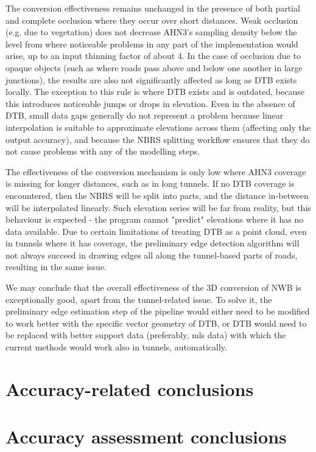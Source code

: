 The conversion effectiveness remains unchanged in the presence of both partial and complete occlusion where they occur over short distances. Weak occlusion (e.g. due to vegetation) does not decrease AHN3's sampling density below the level from where noticeable problems in any part of the implementation would arise, up to an input thinning factor of about 4. In the case of occlusion due to opaque objects (such as where roads pass above and below one another in large junctions), the results are also not significantly affected as long as DTB exists locally. The exception to this rule is where DTB exists and is outdated, because this introduces noticeable jumps or drops in elevation. Even in the absence of DTB, small data gaps generally do not represent a problem because linear interpolation is suitable to approximate elevations across them (affecting only the output accuracy), and because the NBRS splitting workflow ensures that they do not cause problems with any of the modelling steps.

The effectiveness of the conversion mechanism is only low where AHN3 coverage is missing for longer distances, such as in long tunnels. If no DTB coverage is encountered, then the NBRS will be split into parts, and the distance in-between will be interpolated linearly. Such elevation series will be far from reality, but this behaviour is expected - the program cannot "predict" elevations where it has no data available. Due to certain limitations of treating DTB as a point cloud, even in tunnels where it has coverage, the preliminary edge detection algorithm will not always succeed in drawing edges all along the tunnel-based parts of roads, resulting in the same issue.

We may conclude that the overall effectiveness of the 3D conversion of NWB is exceptionally good, apart from the tunnel-related issue. To solve it, the preliminary edge estimation step of the pipeline would either need to be modified to work better with the specific vector geometry of DTB, or DTB would need to be replaced with better support data (preferably, \ac{mls} data) with which the current methods would work also in tunnels, automatically.

\section{Accuracy-related conclusions}
\label{sec:conclusionsaccuracy}

\section{Accuracy assessment conclusions}
\label{sec:conclusionsaccuracyassessment}

